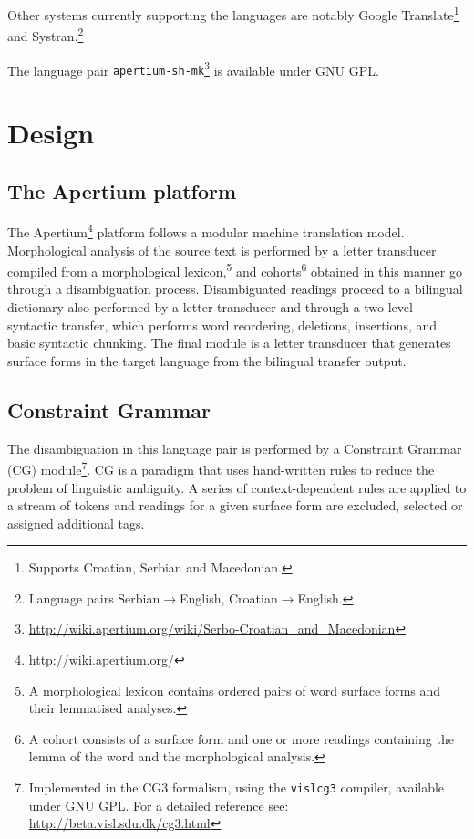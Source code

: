 \documentclass{book}
\begin{document}
Other systems currently supporting the languages are notably Google Translate\footnote{Supports Croatian, Serbian and Macedonian.} and Systran.\footnote{Language pairs Serbian$\rightarrow$English, Croatian$\rightarrow$English.}

The language pair {\small{\tt apertium-sh-mk}}\footnote{\url{http://wiki.apertium.org/wiki/Serbo-Croatian_and_Macedonian}} is available under GNU GPL.

\mainmatter

\section{Design}
\subsection* {The Apertium platform}
\nocite{forcada2011apertium}
The Apertium\footnote{\url{http://wiki.apertium.org/}}  platform follows a modular machine translation model.
Morphological analysis of the source text is performed by a letter 
transducer compiled from a morphological lexicon,\footnote{A morphological lexicon 
contains ordered pairs of word surface forms and their lemmatised analyses.} 
and cohorts\footnote{A cohort 
consists of a surface form and one or more readings containing the lemma of the 
word and the morphological analysis.} obtained in this manner go through
a disambiguation process. 
Disambiguated readings proceed to a bilingual dictionary also performed 
by a letter transducer and  through a two-level syntactic transfer, 
which performs word reordering, deletions, insertions, and basic syntactic chunking.
The final module is a letter transducer that generates surface forms in the target language from 
the bilingual transfer output.

\subsection* {Constraint Grammar}
The 
disambiguation in this language pair is performed by a
Constraint Grammar (CG) module\footnote{Implemented in the CG3 formalism, using the \texttt{vislcg3} compiler, available under GNU GPL. For a detailed reference see: \url{http://beta.visl.sdu.dk/cg3.html}}. CG is a 
paradigm that uses hand-written rules to reduce the problem 
of linguistic ambiguity. A series of context-dependent rules are applied 
to a stream of tokens and readings for a given surface form are excluded, 
selected or assigned additional tags.
\end{document}
